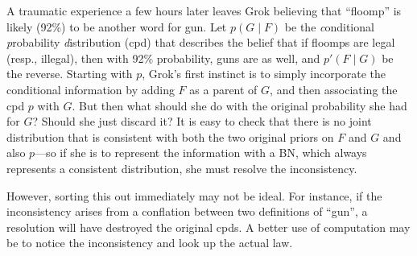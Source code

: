 \documentclass{article}
\theoremstyle{plain}
\theoremstyle{definition}
\theoremstyle{remark}
\newcommand\mat[1]{\mathbf{#1}}
\numberwithin{equation}{section}
\begin{document}
\begin{example}
A traumatic experience a few hours later leaves Grok believing that
 ``floomp'' is likely (92\%) to be another word for gun.
Let $p(G \mid F)$ be the \emph conditional \emph probability \emph
distribution (cpd) that describes 
the belief that if floomps are legal (resp., illegal),
then with 92\% probability, guns are as well, and $p'(F \mid G)$ be the reverse.
Starting with $p$, Grok's first instinct is to
simply incorporate the conditional information by adding $F$ as a parent of
$G$, and then associating
the cpd
$p$ with $G$. But then what should she do
with the original probability she had for $G$?  Should she just discard it?
It is easy to check that there is no 
joint distribution
that is consistent with
both
the two original priors on $F$ and $G$ and also 
$p$---so if she
is to represent the information with a BN, which always represents a consistent
distribution, she must resolve the inconsistency.  

However,
sorting this out immediately may not be ideal.
For instance, if the inconsistency arises from a conflation between two definitions
of ``gun'', a resolution will have destroyed the original cpds. A better use of computation may be to notice the inconsistency and look up the actual law.


\end{example}
\end{document}
